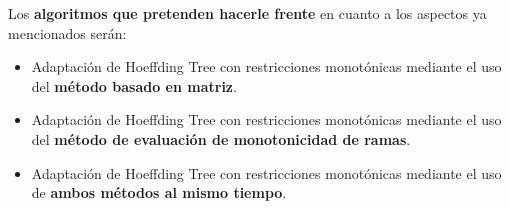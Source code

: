 Los \textbf{algoritmos que pretenden hacerle frente} en cuanto a los aspectos ya mencionados serán:
\begin{itemize}
	\item Adaptación de Hoeffding Tree con restricciones monotónicas mediante el uso del \textbf{método basado en matriz}.
	\item Adaptación de Hoeffding Tree con restricciones monotónicas mediante el uso del \textbf{método de evaluación de monotonicidad de ramas}.
	\item Adaptación de Hoeffding Tree con restricciones monotónicas mediante el uso de\textbf{ ambos métodos al mismo tiempo}.
\end{itemize}











\newpage


